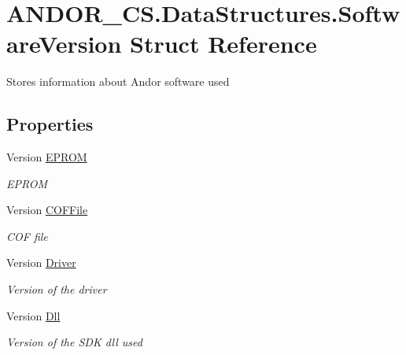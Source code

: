 \hypertarget{struct_a_n_d_o_r___c_s_1_1_data_structures_1_1_software_version}{}\section{A\+N\+D\+O\+R\+\_\+\+C\+S.\+Data\+Structures.\+Software\+Version Struct Reference}
\label{struct_a_n_d_o_r___c_s_1_1_data_structures_1_1_software_version}


Stores information about Andor software used  


\subsection*{Properties}
\begin{DoxyCompactItemize}
\item 
Version \hyperlink{struct_a_n_d_o_r___c_s_1_1_data_structures_1_1_software_version_a00b420d22c12cd7038944d46382d77ee}{E\+P\+R\+OM}
\begin{DoxyCompactList}\small\item\em E\+P\+R\+OM \end{DoxyCompactList}\item 
Version \hyperlink{struct_a_n_d_o_r___c_s_1_1_data_structures_1_1_software_version_ab24d31c261320e38aab2876b019b6360}{C\+O\+F\+File}
\begin{DoxyCompactList}\small\item\em C\+OF file \end{DoxyCompactList}\item 
Version \hyperlink{struct_a_n_d_o_r___c_s_1_1_data_structures_1_1_software_version_a1f2ca5f1b2a907ee87ae9b89850b7c5d}{Driver}
\begin{DoxyCompactList}\small\item\em Version of the driver \end{DoxyCompactList}\item 
Version \hyperlink{struct_a_n_d_o_r___c_s_1_1_data_structures_1_1_software_version_a4ab989f716e98f0462ef432206d77eb7}{Dll}
\begin{DoxyCompactList}\small\item\em Version of the S\+DK dll used \end{DoxyCompactList}\end{DoxyCompactItemize}


